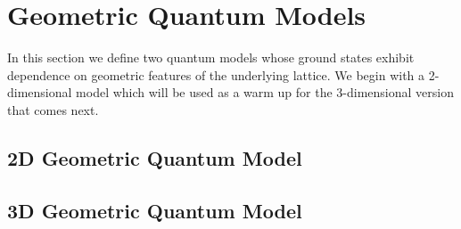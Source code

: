 \documentclass[a4paper,11pt]{article}
\theoremstyle{plain}%
\theoremstyle{definition}
\theoremstyle{remark}
\begin{document}
\section{Geometric Quantum Models}\label{sec:QModels}

In this section we define two quantum models whose ground states exhibit dependence on geometric features of the underlying lattice. We begin with a 2-dimensional model which will be used as a warm up for the 3-dimensional version that comes next.

\subsection{2D Geometric Quantum Model }\label{sec:2Dmodel}

\subsection{3D Geometric Quantum Model }\label{sec:3Dmodel}
\end{document}
